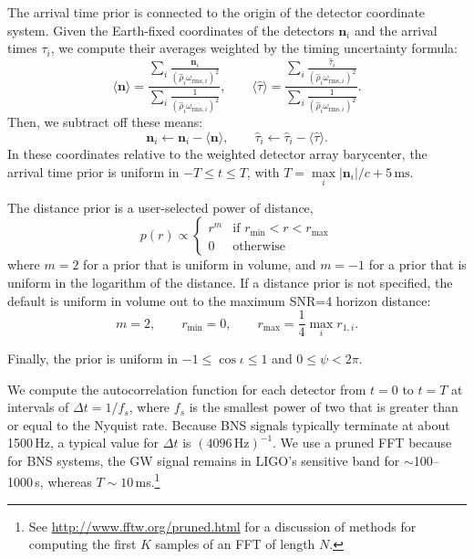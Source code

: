 \documentclass[amsmath,amssymb,aps,prx,reprint,nopreprintnumbers,nofootinbib]{revtex4-1}
\begin{document}
The arrival time prior is connected to the origin of the detector coordinate system. Given the Earth-fixed coordinates of the detectors $\mathbf{n}_i$ and the arrival times $\tau_i$, we compute their averages weighted by the timing uncertainty formula:
%
\begin{equation*}
    \langle \mathbf{n} \rangle = \frac{
        \displaystyle
        \sum_i \frac{\mathbf{n}_i}
            {\left(\hat\rho_i \omega_{\mathrm{rms},i}\right)^2}
    }{
        \displaystyle
        \sum_i \frac{1}{\left(\hat\rho_i \omega_{\mathrm{rms},i}\right)^2}
    },
    \qquad
    \langle \hat\tau \rangle = \frac{
        \displaystyle
        \sum_i \frac{\hat\tau_i}
            {\left(\hat\rho_i \omega_{\mathrm{rms},i}\right)^2}
    }{
        \displaystyle
        \sum_i \frac{1}{\left(\hat\rho_i \omega_{\mathrm{rms},i}\right)^2}
    }.
\end{equation*}
%
Then, we subtract off these means:
%
\begin{equation*}
    \mathbf{n}_i \leftarrow \mathbf{n}_i - \langle \mathbf{n} \rangle,
    \qquad
    \hat\tau_i \leftarrow \hat\tau_i - \langle \hat\tau \rangle.
\end{equation*}
%
In these coordinates relative to the weighted detector array barycenter, the arrival time prior is uniform in $-T \leq t \leq T$, with $T = \max\limits_i |\mathbf{n}_i| / c + 5\,\textrm{ms}$.

The distance prior is a user-selected power of distance,
%
\begin{equation*}
    p(r) \propto \begin{cases}
        r^m & \text{if } r_\mathrm{min} < r < r_\mathrm{max} \\
        0 & \text{otherwise}
    \end{cases}
\end{equation*}
%
where $m=2$ for a prior that is uniform in volume, and $m=-1$ for a prior that is uniform in the logarithm of the distance. If a distance prior is not specified, the default is uniform in volume out to the maximum SNR=4 horizon distance:
%
\begin{equation*}
    m = 2,
    \qquad
    r_\mathrm{min} = 0,
    \qquad
    r_\mathrm{max} = \frac{1}{4} \max_i r_{1,i}.
\end{equation*}

Finally, the prior is uniform in $-1 \leq \cos\iota \leq 1$ and $0 \leq \psi < 2\pi$.

We compute the autocorrelation function for each detector from $t = 0$ to $t = T$ at intervals of $\Delta t = 1/f_s$, where $f_s$ is the smallest power of two that is greater than or equal to the Nyquist rate. Because BNS signals typically terminate at about 1500\,Hz, a typical value for $\Delta t$ is $(4096\,\textrm{Hz})^{-1}$. We use a pruned \ac{FFT} because for BNS systems, the GW signal remains in LIGO's sensitive band for $\sim$100\nobreakdashes--1000\,s, whereas $T \sim 10$\,ms.\footnote{See \url{http://www.fftw.org/pruned.html} for a discussion of methods for computing the first $K$ samples of an \ac{FFT} of length $N$.}
\end{document}
